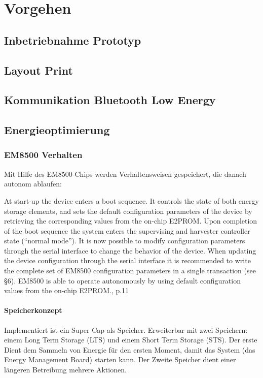 \chapter{Vorgehen}

\section{Inbetriebnahme Prototyp}

\section{Layout Print}

\section{Kommunikation Bluetooth Low Energy}

\section{Energieoptimierung}

\subsection{EM8500 Verhalten}

Mit Hilfe des EM8500-Chips werden Verhaltensweisen gespeichert, die danach autonom ablaufen:

At start-up the device enters a boot sequence. It controls the state of both energy storage elements, and sets the default configuration parameters
of the device by retrieving the corresponding values from the on-chip E2PROM.
Upon completion of the boot sequence the system enters the supervising and harvester controller state (“normal mode”). It is now possible to
modify configuration parameters through the serial interface to change the behavior of the device. When updating the device configuration through
the serial interface it is recommended to write the complete set of EM8500 configuration parameters in a single transaction (see §6).
EM8500 is able to operate autonomously by using default configuration values from the on-chip E2PROM.\cite{datasheet_EM85}, p.11

\subsubsection{Speicherkonzept}

Implementiert ist ein Super Cap als Speicher. Erweiterbar mit zwei Speichern: einem Long Term Storage (LTS) und einem Short Term Storage (STS). Der erste Dient dem Sammeln von Energie für den ersten Moment, damit das System (das Energy Management Board) starten kann. Der Zweite Speicher dient einer längeren Betreibung mehrere Aktionen.



